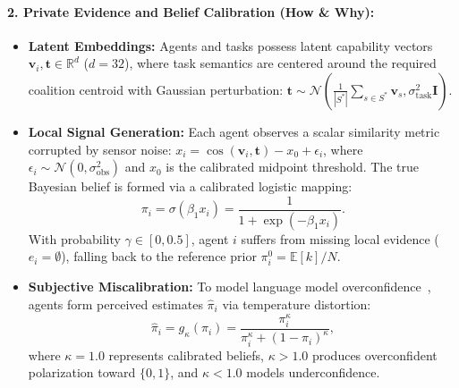 \documentclass{article}
\theoremstyle{definition}
\begin{document}
\paragraph{2. Private Evidence and Belief Calibration (How \& Why):}
\begin{itemize}
    \item \textbf{Latent Embeddings:} Agents and tasks possess latent capability vectors $\mathbf{v}_i, \mathbf{t} \in \mathbb{R}^d$ ($d=32$), where task semantics are centered around the required coalition centroid with Gaussian perturbation: $\mathbf{t} \sim \mathcal{N}\left(\frac{1}{|S^*|}\sum_{s \in S^*} \mathbf{v}_s, \sigma_{\mathrm{task}}^2 \mathbf{I}\right)$.
    \item \textbf{Local Signal Generation:} Each agent observes a scalar similarity metric corrupted by sensor noise: $x_i = \cos(\mathbf{v}_i, \mathbf{t}) - x_0 + \epsilon_i$, where $\epsilon_i \sim \mathcal{N}(0, \sigma_{\mathrm{obs}}^2)$ and $x_0$ is the calibrated midpoint threshold. The true Bayesian belief is formed via a calibrated logistic mapping:
    \begin{equation}
        \pi_i = \sigma(\beta_1 x_i) = \frac{1}{1 + \exp(-\beta_1 x_i)}.
    \end{equation}
    With probability $\gamma \in [0, 0.5]$, agent $i$ suffers from missing local evidence ($e_i = \emptyset$), falling back to the reference prior $\pi_i^0 = \mathbb{E}[k]/N$.
    \item \textbf{Subjective Miscalibration:} To model language model overconfidence~\cite{xiong2024can}, agents form perceived estimates $\hat{\pi}_i$ via temperature distortion:
    \begin{equation}
        \hat{\pi}_i = g_\kappa(\pi_i) = \frac{\pi_i^\kappa}{\pi_i^\kappa + (1 - \pi_i)^\kappa},
    \end{equation}
    where $\kappa = 1.0$ represents calibrated beliefs, $\kappa > 1.0$ produces overconfident polarization toward $\{0, 1\}$, and $\kappa < 1.0$ models underconfidence.
\end{itemize}
\end{document}
